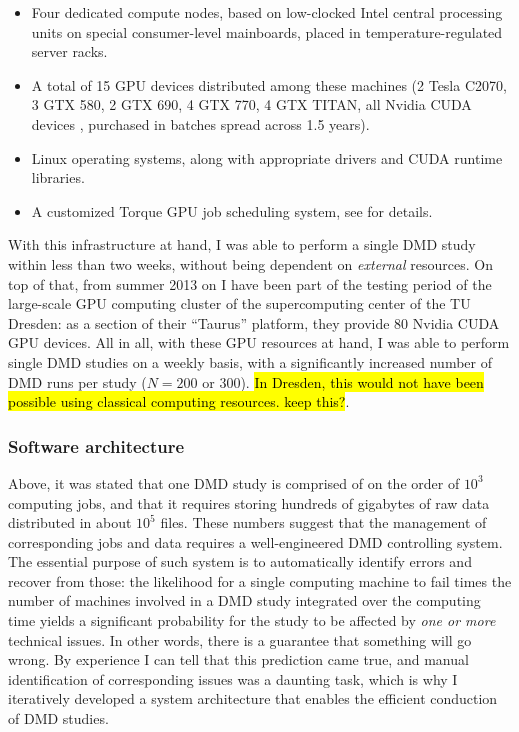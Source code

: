\begin{itemize}
\item Four dedicated compute nodes, based on low-clocked Intel central
processing units on special consumer-level mainboards, placed in
temperature-regulated server racks.
\item A total of 15 GPU devices distributed among these machines (2 Tesla C2070,
3 GTX 580, 2 GTX 690, 4 GTX 770, 4 GTX TITAN, all Nvidia CUDA devices
\cite{nvidia_cuda_devices}, purchased in batches spread across 1.5 years).
\item Linux operating systems, along with appropriate drivers and CUDA runtime
libraries.
\item A customized Torque \cite{torque_website} GPU job scheduling system, see
\cite{gehrcke_torque_gpu_setup} for details.
\end{itemize}

With this infrastructure at hand, I was able to perform a single DMD study
within less than two weeks, without being dependent on \textit{external}
resources. On top of that, from summer 2013 on I have been part of the testing
period of the large-scale GPU computing cluster of the supercomputing center of
the TU Dresden: as a section of their \enquote{Taurus} platform, they provide 80
Nvidia CUDA GPU devices. All in all, with these GPU resources at hand, I was
able to perform single DMD studies on a weekly basis, with a significantly
increased number of DMD runs per study ($N=200$ or $300$). \hl{In Dresden, this
would not have been possible using classical computing resources. keep this?}.


\subsubsection{Software architecture}

Above, it was stated that one DMD study is comprised of on the order of $10^3$
computing jobs, and that it requires storing hundreds of gigabytes of raw data
distributed in about $10^5$ files. These numbers suggest that the management of
corresponding jobs and data requires a well-engineered DMD controlling system.
The essential purpose of such system is to automatically identify errors and
recover from those: the likelihood for a single computing machine to fail times
the number of machines involved in a DMD study integrated over the computing
time yields a significant probability for the study to be affected by
\textit{one or more} technical issues. In other words, there is a guarantee
that something will go wrong. By experience I can tell that this prediction came
true, and manual identification of corresponding issues was a daunting task,
which is why I iteratively developed a system architecture that enables the
efficient conduction of DMD studies.

